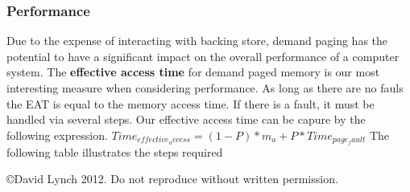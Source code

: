 \documentclass[10pt,a4paper]{article}
\begin{document}
\subsubsection{Performance}
Due to the expense of interacting with backing store, demand paging has the potential to have a significant impact on the overall performance of a computer system. The {\bf effective access time} for demand paged memory is our most interesting measure when considering performance. As long as there are no fauls the EAT is equal to the memory access time. If there is a fault, it must be handled via several steps. Our effective access time can be capure by the following expression.
$Time_{effective_access} = (1 - P) * m_{a} + P * Time_{page_fault}$
\newline\newline
The following table illustrates the steps required


{}

\begin{center}
{\small \copyright  David Lynch 2012. Do not reproduce without written permission.}
\end{center}
\end{document}
